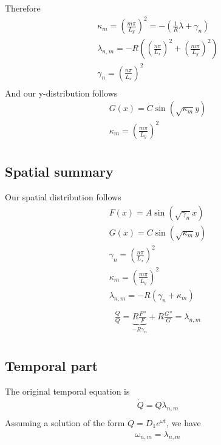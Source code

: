 \documentclass[11pt]{article}
\begin{document}
Therefore
\begin{equation}\begin{aligned}
	\kappa_{m} = \left( \frac{m\pi}{L_y} \right)^2 = -\left( \frac{1}{R} \lambda + \gamma_n \right) \\
	\lambda_{n,m} = - R \left( \left( \frac{n\pi}{L_x} \right)^2 + \left( \frac{m\pi}{L_y} \right)^2 \right) \\
	\gamma_n = \left( \frac{n\pi}{L_x} \right)^2 \\
\end{aligned} \end{equation}
And our y-distribution follows
\begin{equation}\begin{aligned}
 G(x) = C \sin(\sqrt{\kappa_{m}} y) \\
 \kappa_{m} = \left( \frac{m\pi}{L_y} \right)^2 \\
\end{aligned} \end{equation}
\subsection{Spatial summary}
Our spatial distribution follows
\begin{equation}\begin{aligned}
 F(x) = A \sin(\sqrt{\gamma_n} x) \\
 G(x) = C \sin(\sqrt{\kappa_{m}} y) \\
 \gamma_n = \left( \frac{n\pi}{L_x} \right)^2 \\
 \kappa_{m} = \left( \frac{m\pi}{L_y} \right)^2 \\
 \lambda_{n,m} = - R \left( \gamma_n + \kappa_{m} \right) \\
\end{aligned} \end{equation}
\begin{equation}\begin{aligned}
\frac{\dot{Q}}{Q} = \underbrace{R \frac{F''}{F}}_{-R\gamma_n} + R \frac{G''}{G} = \lambda_{n,m} \\
\end{aligned} \end{equation}

\subsection{Temporal part}
The original temporal equation is
\begin{equation}\begin{aligned}
\dot{Q} = Q \lambda_{n,m} \\
\end{aligned} \end{equation}
Assuming a solution of the form $Q = D_1 e^{\omega t}$, we have
\begin{equation}\begin{aligned}
\omega_{n,m} = \lambda_{n,m} \\
\end{aligned} \end{equation}
\end{document}
